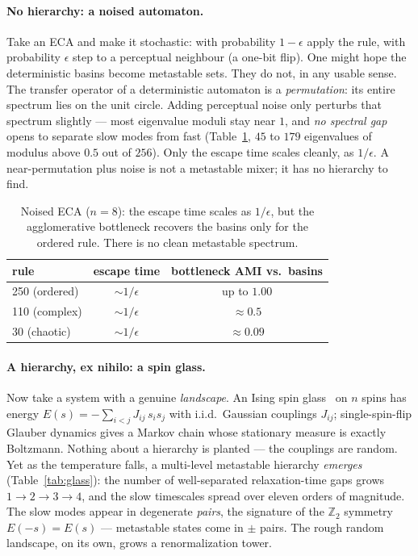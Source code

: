 \documentclass[11pt]{article}
\begin{document}
\paragraph{No hierarchy: a noised automaton.}
Take an ECA and make it stochastic: with probability $1-\epsilon$ apply the
rule, with probability $\epsilon$ step to a perceptual neighbour (a one-bit
flip). One might hope the deterministic basins become metastable sets. They do
not, in any usable sense. The transfer operator of a deterministic automaton is
a \emph{permutation}: its entire spectrum lies on the unit circle. Adding
perceptual noise only perturbs that spectrum slightly --- most eigenvalue moduli
stay near $1$, and \emph{no spectral gap} opens to separate slow modes from
fast (Table~\ref{tab:noise}, $45$ to $179$ eigenvalues of modulus above $0.5$
out of $256$). Only the escape time scales cleanly, as $1/\epsilon$. A
near-permutation plus noise is not a metastable mixer; it has no hierarchy to
find.

\begin{table}[h]
\centering
\caption{Noised ECA ($n{=}8$): the escape time scales as $1/\epsilon$, but the
agglomerative bottleneck recovers the basins only for the ordered rule. There
is no clean metastable spectrum.}
\label{tab:noise}
\begin{tabular}{lcc}
\toprule
rule & escape time & bottleneck AMI vs.\ basins \\
\midrule
250 (ordered)  & ${\sim}1/\epsilon$ & up to $1.00$ \\
110 (complex)  & ${\sim}1/\epsilon$ & ${\approx}0.5$ \\
30  (chaotic)  & ${\sim}1/\epsilon$ & ${\approx}0.09$ \\
\bottomrule
\end{tabular}
\end{table}

\paragraph{A hierarchy, ex nihilo: a spin glass.}
Now take a system with a genuine \emph{landscape}. An Ising spin
glass~\citep{mezard1987} on $n$ spins has energy
$E(s) = -\sum_{i<j} J_{ij}\,s_i s_j$ with i.i.d.\ Gaussian
couplings $J_{ij}$; single-spin-flip Glauber dynamics gives a Markov chain
whose stationary measure is exactly Boltzmann. Nothing about a hierarchy is
planted --- the couplings are random. Yet as the temperature falls, a
multi-level metastable hierarchy \emph{emerges} (Table~\ref{tab:glass}): the
number of well-separated relaxation-time gaps grows $1 \to 2 \to 3 \to 4$, and
the slow timescales spread over eleven orders of magnitude. The slow modes
appear in degenerate \emph{pairs}, the signature of the $\mathbb{Z}_2$ symmetry
$E(-s) = E(s)$ --- metastable states come in $\pm$ pairs. The rough random
landscape, on its own, grows a renormalization tower.
\end{document}
